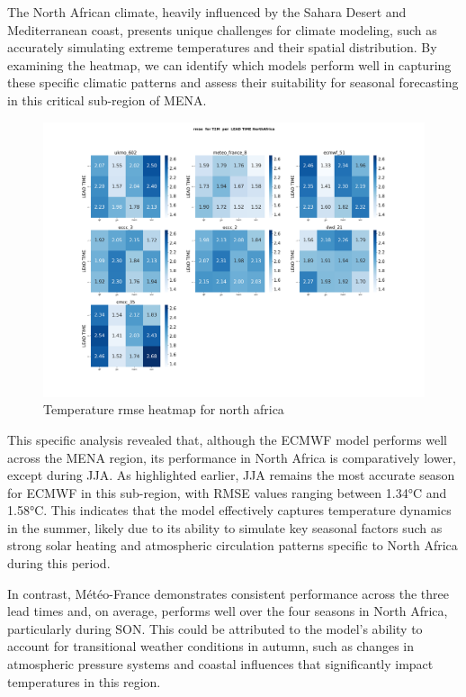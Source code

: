 The North African climate, heavily influenced by the Sahara Desert and Mediterranean coast, presents unique challenges for climate modeling, such as accurately simulating extreme temperatures and their spatial distribution. By examining the heatmap, we can identify which models perform well in capturing these specific climatic patterns and assess their suitability for seasonal forecasting in this critical sub-region of MENA.
\begin{figure}[H]
    \centering
    \includegraphics[width=1\linewidth]{plots/det/rmse/rmse_T2M_NorthAfrica.png}
    \caption{Temperature rmse heatmap for north africa}
   
\end{figure}
This specific analysis revealed that, although the ECMWF model performs well across the MENA region, its performance in North Africa is comparatively lower, except during JJA. As highlighted earlier, JJA remains the most accurate season for ECMWF in this sub-region, with RMSE values ranging between 1.34°C and 1.58°C. This indicates that the model effectively captures temperature dynamics in the summer, likely due to its ability to simulate key seasonal factors such as strong solar heating and atmospheric circulation patterns specific to North Africa during this period.

In contrast, Météo-France demonstrates consistent performance across the three lead times and, on average, performs well over the four seasons in North Africa, particularly during SON. This could be attributed to the model’s ability to account for transitional weather conditions in autumn, such as changes in atmospheric pressure systems and coastal influences that significantly impact temperatures in this region.

